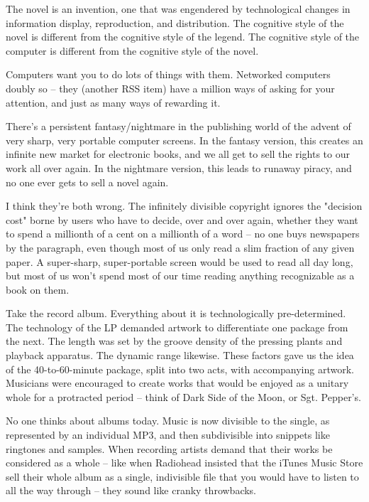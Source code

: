 The novel is an invention, one that was engendered by technological
changes in information display, reproduction, and distribution. The
cognitive style of the novel is different from the cognitive style
of the legend. The cognitive style of the computer is different
from the cognitive style of the novel.

Computers want you to do lots of things with them. Networked
computers doubly so -- they (another RSS item) have a million ways
of asking for your attention, and just as many ways of rewarding
it.

There's a persistent fantasy/nightmare in the publishing world of
the advent of very sharp, very portable computer screens. In the
fantasy version, this creates an infinite new market for electronic
books, and we all get to sell the rights to our work all over
again. In the nightmare version, this leads to runaway piracy, and
no one ever gets to sell a novel again.

I think they're both wrong. The infinitely divisible copyright
ignores the "decision cost" borne by users who have to decide, over
and over again, whether they want to spend a millionth of a cent on
a millionth of a word -- no one buys newspapers by the paragraph,
even though most of us only read a slim fraction of any given
paper. A super-sharp, super-portable screen would be used to read
all day long, but most of us won't spend most of our time reading
anything recognizable as a book on them.

Take the record album. Everything about it is technologically
pre-determined. The technology of the LP demanded artwork to
differentiate one package from the next. The length was set by the
groove density of the pressing plants and playback apparatus. The
dynamic range likewise. These factors gave us the idea of the
40-to-60-minute package, split into two acts, with accompanying
artwork. Musicians were encouraged to create works that would be
enjoyed as a unitary whole for a protracted period -- think of Dark
Side of the Moon, or Sgt. Pepper's.

No one thinks about albums today. Music is now divisible to the
single, as represented by an individual MP3, and then subdivisible
into snippets like ringtones and samples. When recording artists
demand that their works be considered as a whole -- like when
Radiohead insisted that the iTunes Music Store sell their whole
album as a single, indivisible file that you would have to listen
to all the way through -- they sound like cranky throwbacks.

